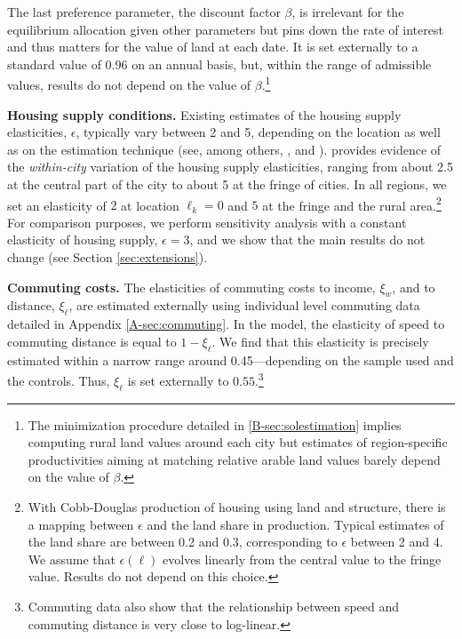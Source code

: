 \documentclass[./20250130-paper.tex]{subfiles}
\begin{document}
The last preference parameter, the discount factor $\beta$, is irrelevant for the equilibrium allocation given other parameters but pins down the rate of interest and thus matters for the value of land at each date. It is set externally to a standard value of $0.96$ on an annual basis, but, within the range of admissible values, results do not depend on the value of $\beta$.\footnote{The minimization procedure detailed in \ref{B-sec:solestimation} implies computing rural land values around each city but estimates of region-specific productivities aiming at matching relative arable land values barely depend on the value of $\beta$.} 

\textbf{Housing supply conditions.} Existing estimates of the housing supply elasticities, $\epsilon$, typically vary between 2 and 5, depending on the location as well as on the estimation technique (see, among others, \cite{albouyehrlichshin2018},  \cite{combesetal2019} and \cite{baumsnowhan2020}). \cite{baumsnowhan2020} provides evidence of the \textit{within-city} variation of the housing supply elasticities, ranging from about 2.5 at the central part of the city to about 5 at the fringe of cities. In all regions, we set an elasticity of $2$ at location $\ell_k=0$ and $5$ at the fringe and the rural area.\footnote{With Cobb-Douglas production of housing using land and structure, there is a mapping between $\epsilon$ and the land share in production. Typical estimates of the land share are between 0.2 and 0.3, corresponding to $\epsilon$ between 2 and 4. We assume that $\epsilon(\ell)$ evolves linearly from the central value to the fringe value. Results do not depend on this choice.} For comparison purposes, we perform sensitivity analysis with a constant elasticity of housing supply, $\epsilon=3$, and we show that the main results do not change (see Section \ref{sec:extensions}).

\textbf{Commuting costs.} The elasticities of commuting costs to income, $\xi_w$, and to distance, $\xi_\ell$, are estimated externally using individual level commuting data detailed in Appendix \ref{A-sec:commuting}. In the model, the elasticity of speed to commuting distance is equal to $1-\xi_\ell$. We find that this elasticity is precisely estimated within a narrow range around 0.45---depending on the sample used and the controls. Thus, $\xi_\ell$ is set externally to $0.55$.\footnote{Commuting data also show that the relationship between speed and commuting distance is very close to log-linear.}  
\end{document}
